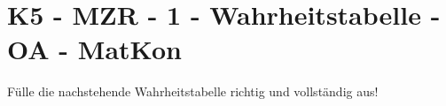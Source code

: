 \section{K5 - MZR - 1 - Wahrheitstabelle - OA - MatKon}

\begin{beispiel}[K5 - MZR]{1}
\begin{beispiel}{1} %
				Fülle die nachstehende Wahrheitstabelle richtig und vollständig aus!
				
				\begin{center}
				\end{center}
\end{beispiel}
\end{beispiel}